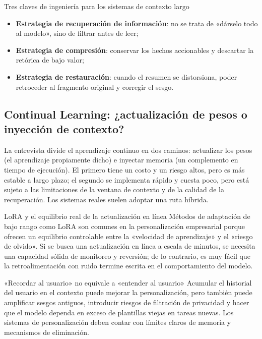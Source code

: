 \documentclass[a4paper]{article}
\begin{document}
\begin{importantbox}{Tres claves de ingeniería para los sistemas de contexto largo}
\begin{itemize}[leftmargin=1.5em]
    \item \textbf{Estrategia de recuperación de información}: no se trata de «dárselo todo al modelo», sino de filtrar antes de leer;
    \item \textbf{Estrategia de compresión}: conservar los hechos accionables y descartar la retórica de bajo valor;
    \item \textbf{Estrategia de restauración}: cuando el resumen se distorsiona, poder retroceder al fragmento original y corregir el sesgo.
\end{itemize}
\end{importantbox}

\subsection{Continual Learning: ¿actualización de pesos o inyección de contexto?}

La entrevista divide el aprendizaje continuo en dos caminos: actualizar los pesos (el aprendizaje propiamente dicho) e inyectar memoria (un complemento en tiempo de ejecución). El primero tiene un costo y un riesgo altos, pero es más estable a largo plazo; el segundo se implementa rápido y cuesta poco, pero está sujeto a las limitaciones de la ventana de contexto y de la calidad de la recuperación. Los sistemas reales suelen adoptar una ruta híbrida.

\begin{knowledgebox}{LoRA y el equilibrio real de la actualización en línea}
Métodos de adaptación de bajo rango como LoRA son comunes en la personalización empresarial porque ofrecen un equilibrio controlable entre la «velocidad de aprendizaje» y el «riesgo de olvido». Si se busca una actualización en línea a escala de minutos, se necesita una capacidad sólida de monitoreo y reversión; de lo contrario, es muy fácil que la retroalimentación con ruido termine escrita en el comportamiento del modelo.
\end{knowledgebox}

\begin{warningbox}{«Recordar al usuario» no equivale a «entender al usuario»}
Acumular el historial del usuario en el contexto puede mejorar la personalización, pero también puede amplificar sesgos antiguos, introducir riesgos de filtración de privacidad y hacer que el modelo dependa en exceso de plantillas viejas en tareas nuevas. Los sistemas de personalización deben contar con límites claros de memoria y mecanismos de eliminación.
\end{warningbox}
\end{document}
